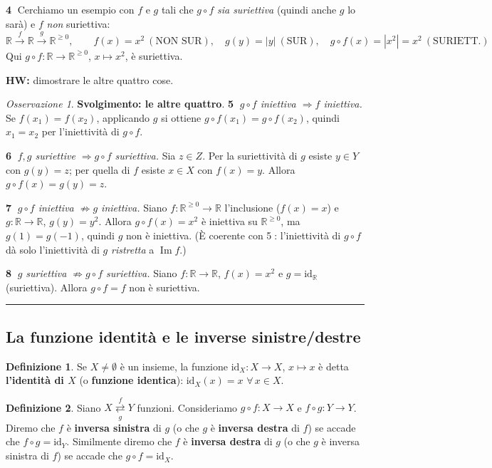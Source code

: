 \documentclass[11pt,a4paper]{article}
\newcommand{\R}{\mathbb{R}}
\newcommand{\id}{\mathrm{id}}
\newcommand{\im}{\operatorname{Im}}
\theoremstyle{definition}
\newtheorem{definizione}{Definizione}[section]
\theoremstyle{plain}
\theoremstyle{remark}
\newtheorem*{osservazione}{Osservazione}
\begin{document}
\textbf{\textcircled{4}} Cerchiamo un esempio con $f$ e $g$ tali che $g\circ f$ \emph{sia suriettiva} (quindi anche $g$ lo sar\`a) e $f$ \emph{non} suriettiva:
\[
\R\xrightarrow{\ f\ }\R\xrightarrow{\ g\ }\R^{\ge0},\qquad
f(x)=x^2\ (\text{NON SUR}),\quad g(y)=|y|\ (\text{SUR}),\quad g\circ f(x)=|x^2|=x^2\ (\text{SURIETT.})
\]
Qui $g\circ f\colon\R\to\R^{\ge0}$, $x\mapsto x^2$, \`e suriettiva.

\textbf{HW:} dimostrare le altre quattro cose.

\begin{osservazione}
\textbf{Svolgimento: le altre quattro}. 
\textbf{\textcircled{5}} \emph{$g\circ f$ iniettiva $\Rightarrow f$ iniettiva.} Se $f(x_1)=f(x_2)$, applicando $g$ si ottiene $g\circ f(x_1)=g\circ f(x_2)$, quindi $x_1=x_2$ per l'iniettivit\`a di $g\circ f$.

\textbf{\textcircled{6}} \emph{$f,g$ suriettive $\Rightarrow g\circ f$ suriettiva.} Sia $z\in Z$. Per la suriettivit\`a di $g$ esiste $y\in Y$ con $g(y)=z$; per quella di $f$ esiste $x\in X$ con $f(x)=y$. Allora $g\circ f(x)=g(y)=z$.

\textbf{\textcircled{7}} \emph{$g\circ f$ iniettiva $\not\Rightarrow g$ iniettiva.} Siano $f\colon\R^{\ge0}\to\R$ l'inclusione ($f(x)=x$) e $g\colon\R\to\R$, $g(y)=y^2$. Allora $g\circ f(x)=x^2$ \`e iniettiva su $\R^{\ge0}$, ma $g(1)=g(-1)$, quindi $g$ non \`e iniettiva. (\`E coerente con \textcircled{5}: l'iniettivit\`a di $g\circ f$ d\`a solo l'iniettivit\`a di $g$ \emph{ristretta} a $\im f$.)

\textbf{\textcircled{8}} \emph{$g$ suriettiva $\not\Rightarrow g\circ f$ suriettiva.} Siano $f\colon\R\to\R$, $f(x)=x^2$ e $g=\id_\R$ (suriettiva). Allora $g\circ f=f$ non \`e suriettiva.
\end{osservazione}

\bigskip\hrule\bigskip

\subsection{La funzione identit\`a e le inverse sinistre/destre}

\begin{definizione}
Se $X\neq\emptyset$ \`e un insieme, la funzione $\id_X\colon X\to X$, $x\mapsto x$ \`e detta \textbf{l'identit\`a di $X$} (o \textbf{funzione identica}): $\id_X(x)=x$ $\forall\,x\in X$.
\end{definizione}

\begin{definizione}
Siano $X\underset{g}{\overset{f}{\rightleftarrows}}Y$ funzioni. Consideriamo $g\circ f\colon X\to X$ e $f\circ g\colon Y\to Y$.
Diremo che $f$ \`e \textbf{inversa sinistra} di $g$ (o che $g$ \`e \textbf{inversa destra} di $f$) se accade che $f\circ g=\id_Y$.
Similmente diremo che $f$ \`e \textbf{inversa destra} di $g$ (o che $g$ \`e inversa sinistra di $f$) se accade che $g\circ f=\id_X$.
\end{definizione}
\end{document}

